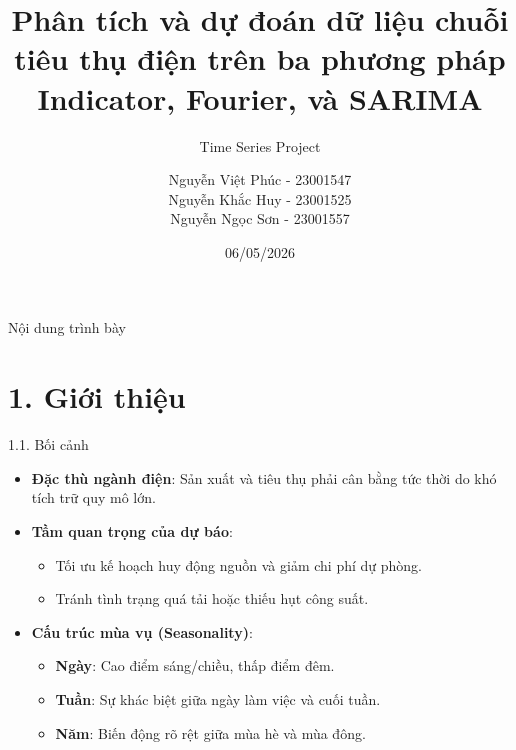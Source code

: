 \documentclass[aspectratio=43]{beamer}
\title[Phân tích và dự đoán dữ liệu
chuỗi tiêu thụ điện trên ba phương pháp Indicator,
Fourier, và SARIMA]{Phân tích và dự đoán dữ liệu
chuỗi tiêu thụ điện trên ba phương pháp Indicator,
Fourier, và SARIMA}
\subtitle{Time Series Project}
\author[Nhóm 9]{ 
    Nguyễn Việt Phúc - 23001547 \\ 
    Nguyễn Khắc Huy - 23001525 \\ 
    Nguyễn Ngọc Sơn - 23001557
}
\date[06/05/2026]{06/05/2026}
\begin{document}
\begin{frame}[plain] 
    \maketitle
\end{frame}

\begin{frame}{Nội dung trình bày}
    \tableofcontents[hideallsubsections] 
\end{frame}

\section{1. Giới thiệu}

\begin{frame}{1.1. Bối cảnh}
    \begin{itemize}
        \item \textbf{Đặc thù ngành điện}: Sản xuất và tiêu thụ phải cân bằng tức thời do khó tích trữ quy mô lớn.
        \item \textbf{Tầm quan trọng của dự báo}: 
        \begin{itemize}
            \item Tối ưu kế hoạch huy động nguồn và giảm chi phí dự phòng.
            \item Tránh tình trạng quá tải hoặc thiếu hụt công suất.
        \end{itemize}
        \item \textbf{Cấu trúc mùa vụ (Seasonality)}: 
        \begin{itemize}
            \item \textbf{Ngày}: Cao điểm sáng/chiều, thấp điểm đêm.
            \item \textbf{Tuần}: Sự khác biệt giữa ngày làm việc và cuối tuần.
            \item \textbf{Năm}: Biến động rõ rệt giữa mùa hè và mùa đông.
        \end{itemize}
    \end{itemize}
\end{frame}
\end{document}
